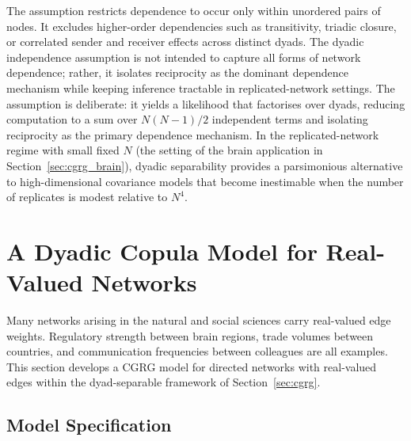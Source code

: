\documentclass[12pt]{article}
\begin{document}
The assumption restricts dependence to occur only within unordered pairs of
nodes.  It excludes higher-order dependencies such as transitivity, triadic
closure, or correlated sender and receiver effects across distinct dyads.
The dyadic independence assumption is not intended to capture all forms of
network dependence; rather, it isolates reciprocity as the dominant
dependence mechanism while keeping inference tractable in replicated-network
settings.
The assumption is deliberate: it yields a likelihood that factorises over
dyads, reducing computation to a sum over $N(N-1)/2$ independent terms and
isolating reciprocity as the primary dependence mechanism.  In the
replicated-network regime with small fixed $N$ (the setting of the brain
application in Section~\ref{sec:cgrg_brain}), dyadic separability provides
a parsimonious alternative to
high-dimensional covariance models that become inestimable when the number of
replicates is modest relative to $N^4$.

%
%


\section{A Dyadic Copula Model for Real-Valued Networks}
\label{sec:realvalued}

Many networks arising in the natural and social sciences carry real-valued
edge weights.  Regulatory strength between brain regions, trade volumes
between countries, and communication frequencies between colleagues are
all examples.  This section develops a CGRG model for directed networks
with real-valued edges within the dyad-separable framework of
Section~\ref{sec:cgrg}.

\subsection{Model Specification}
\end{document}
